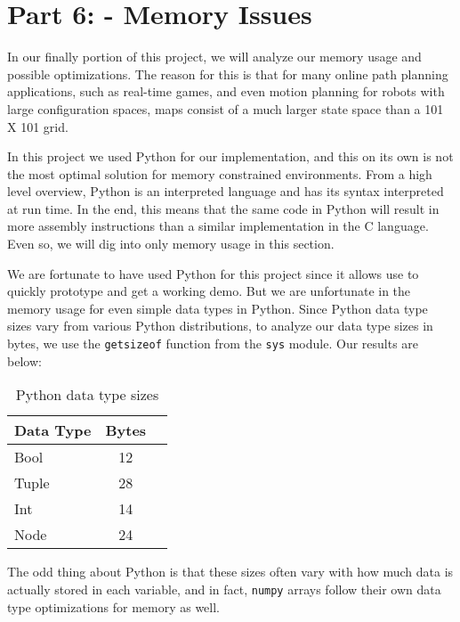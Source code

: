 \section{Part 6: - Memory Issues}
\label{sec: Part 6}

In our finally portion of this project, we will analyze our memory usage and possible optimizations. The reason for this is that for many online path planning applications, such as real-time games, and even motion planning for robots with large configuration spaces, maps consist of a much larger state space than a 101 X 101 grid.


In this project we used Python for our implementation, and this on its own is not the most optimal solution for memory constrained environments. From a high level overview, Python is an interpreted language and has its syntax interpreted at run time. In the end, this means that the same code in Python will result in more assembly instructions than a similar implementation in the C language. Even so, we will dig into only memory usage in this section. 


We are fortunate to have used Python for this project since it allows use to quickly prototype and get a working demo. But we are unfortunate in the memory usage for even simple data types in Python. Since Python data type sizes vary from various Python distributions, to analyze our data type sizes in bytes, we use the \texttt{getsizeof} function from the \texttt{sys} module. Our results are below:

\begin{table}[H]
  \begin{center}
    \begin{tabular}{l|c|r}
      \textbf{Data Type} & \textbf{Bytes}\\
      \hline
      Bool & 12\\
      Tuple & 28\\
      Int & 14\\
      Node & 24\\
    \end{tabular}
    \caption{Python data type sizes}
  \end{center}
\end{table}

The odd thing about Python is that these sizes often vary with how much data is actually stored in each variable, and in fact, \texttt{numpy} arrays follow their own data type  optimizations for memory as well. 


